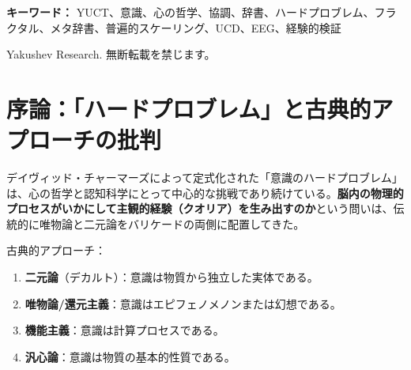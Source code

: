 \documentclass[12pt,a4paper]{article}
\DeclareRobustCommand{\alD}{\texorpdfstring{\ensuremath{\alpha_{\mathrm{D}}}}{alpha_D}}
\DeclareRobustCommand{\beI}{\texorpdfstring{\ensuremath{\beta_{\mathrm{I}}}}{beta_I}}
\DeclareRobustCommand{\gaR}{\texorpdfstring{\ensuremath{\gamma_{\mathrm{R}}}}{gamma_R}}
\newcommand{\eff}{\mathrm{eff}}
\newcommand{\Ke}{K_{\eff}}
\begin{document}
\begin{titlepage}
\begin{center}
\begin{abstract}
				決定的に重要なのは、この哲学的枠組みが、50桁以上の規模にわたって検証された普遍的法則 \(\varepsilon = \kappa_c \alpha \Ke^{-\beta}\)（\(\beta = 0.67\)）（付録L）に基づいており、6つの科学領域で独立に確認されていることである：物理学（重力波、GWTC-4.0）、天体物理学（白色矮星、26,041天体）、地球物理学（地球–月系）、化学（873の結合エネルギー）、生物学（68の脊椎動物ゲノム）、神経科学（意識のEEG相関、UCDパラメータ）。特に、付録Hで導入された普遍意識記述子（UCD）は、意識状態と相関し、同じスケーリング則に従う定量的尺度 \(\alD, \beI, \gaR\) を提供する。
				
				哲学的含意には以下が含まれる：(1) 還元主義なき意識の自然化；(2) 協調辞書の複雑性の成長としての心の進化の新たな理解；(3) 非人間中心的意識形態（人工的、集団的、惑星的）の可能性；(4) 宇宙論的協調の限界としての暗黒物質・暗黒エネルギーとの関連。YUCTは、「ハードプロブレム」の解決策だけでなく、神経科学、物理学、人文学の間の対話のための統一された哲学的プラットフォームを提供し、それが今や経験的に検証されている。
			\end{abstract}
			
			\vspace{0cm}
			
			\noindent
			\small\textbf{キーワード：} YUCT、意識、心の哲学、協調、辞書、ハードプロブレム、フラクタル、メタ辞書、普遍的スケーリング、UCD、EEG、経験的検証
			
			\vspace{0.5cm}
			
			\noindent
			 Yakushev Research. 無断転載を禁じます。
		\end{center}
	\end{titlepage}
	
	\tableofcontents
	
	\newpage
	
	\section{序論：「ハードプロブレム」と古典的アプローチの批判}
	
	デイヴィッド・チャーマーズによって定式化された「意識のハードプロブレム」は、心の哲学と認知科学にとって中心的な挑戦であり続けている。\textbf{脳内の物理的プロセスがいかにして主観的経験（クオリア）を生み出すのか}という問いは、伝統的に唯物論と二元論をバリケードの両側に配置してきた。
	
	古典的アプローチ：
	\begin{enumerate}
		\item \textbf{二元論}（デカルト）：意識は物質から独立した実体である。
		\item \textbf{唯物論/還元主義}：意識はエピフェノメノンまたは幻想である。
		\item \textbf{機能主義}：意識は計算プロセスである。
		\item \textbf{汎心論}：意識は物質の基本的性質である。
	\end{enumerate}
	
\end{document}
